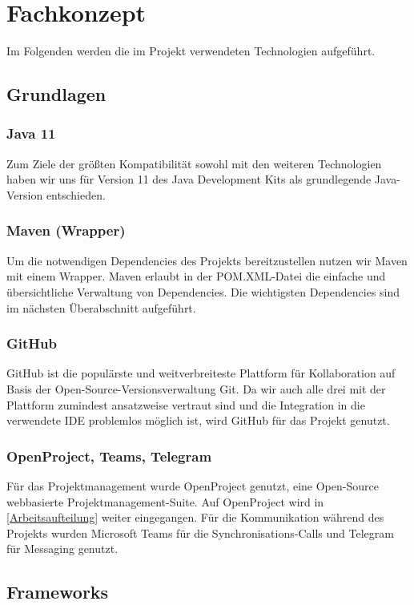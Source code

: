 

\section{Fachkonzept}
\label{Technologien}

Im Folgenden werden die im Projekt verwendeten Technologien aufgeführt.

\subsection{Grundlagen}

\subsubsection*{Java 11}
Zum Ziele der größten Kompatibilität sowohl mit den weiteren Technologien haben wir uns für Version 11 des Java Development Kits als grundlegende Java-Version entschieden.
\subsubsection*{Maven (Wrapper)}
Um die notwendigen Dependencies des Projekts bereitzustellen nutzen wir Maven mit einem Wrapper. Maven erlaubt in der POM.XML-Datei die einfache und übersichtliche Verwaltung von Dependencies. Die wichtigsten Dependencies sind im nächsten Überabschnitt aufgeführt.
\subsubsection*{GitHub}
GitHub ist die populärste und weitverbreiteste Plattform für Kollaboration auf Basis der Open-Source-Versionsverwaltung Git. Da wir auch alle drei mit der Plattform zumindest ansatzweise vertraut sind und die Integration in die verwendete IDE problemlos möglich ist, wird GitHub für das Projekt genutzt.
\subsubsection*{OpenProject, Teams, Telegram}
Für das Projektmanagement wurde OpenProject genutzt, eine Open-Source webbasierte Projektmanagement-Suite. Auf OpenProject wird in \autoref{Arbeitsaufteilung} weiter eingegangen.
Für die Kommunikation während des Projekts wurden Microsoft Teams für die Synchronisations-Calls und Telegram für Messaging genutzt.

\subsection{Frameworks}
%

